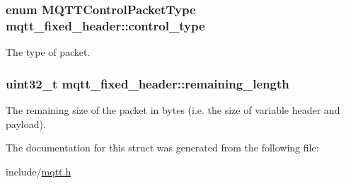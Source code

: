 \subsubsection[{\texorpdfstring{control\+\_\+type}{control_type}}]{\setlength{\rightskip}{0pt plus 5cm}enum {\bf M\+Q\+T\+T\+Control\+Packet\+Type} mqtt\+\_\+fixed\+\_\+header\+::control\+\_\+type}\hypertarget{structmqtt__fixed__header_a9bdea10facdc20756c457f282d58cfa1}{}\label{structmqtt__fixed__header_a9bdea10facdc20756c457f282d58cfa1}
The type of packet. 
\subsubsection[{\texorpdfstring{remaining\+\_\+length}{remaining_length}}]{\setlength{\rightskip}{0pt plus 5cm}uint32\+\_\+t mqtt\+\_\+fixed\+\_\+header\+::remaining\+\_\+length}\hypertarget{structmqtt__fixed__header_ac01e888a49b83e3d34ca14f140b72d7a}{}\label{structmqtt__fixed__header_ac01e888a49b83e3d34ca14f140b72d7a}
The remaining size of the packet in bytes (i.\+e. the size of variable header and payload). 

The documentation for this struct was generated from the following file\+:\begin{DoxyCompactItemize}
\item 
include/\hyperlink{mqtt_8h}{mqtt.\+h}\end{DoxyCompactItemize}
